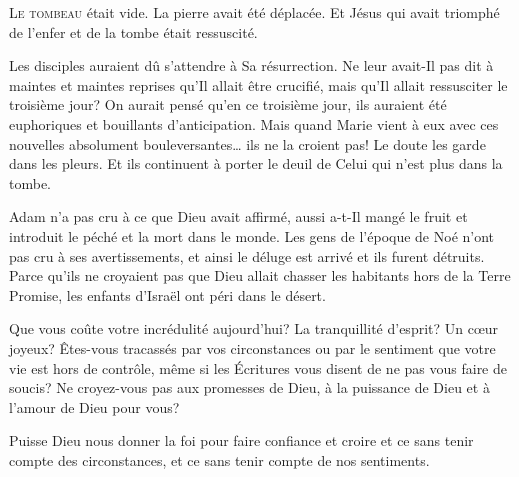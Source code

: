 \dvrule







\lettrine{L}{e tombeau} était vide. La pierre avait été déplacée.
 Et Jésus \ocadr qui avait triomphé de l'enfer et de la tombe \fcadr{}
 était ressuscité.

Les disciples auraient dû s'attendre à Sa résurrection.
 Ne leur avait-Il pas dit à maintes et maintes reprises
 qu'Il allait être crucifié, mais qu'Il allait ressusciter le troisième jour?
 On aurait pensé 
 qu'en ce troisième jour, ils auraient été euphoriques
 et bouillants  d'anticipation.
 Mais quand Marie vient à eux avec ces nouvelles absolument
 bouleversantes\dots{} ils ne la croient pas!
 Le doute les garde dans les pleurs.
 Et ils continuent à  porter
 le deuil de Celui qui n'est plus dans la tombe.


Adam n'a pas cru à ce que Dieu avait affirmé, aussi a-t-Il mangé
 le fruit et introduit le péché et la mort dans le monde.
 Les gens de l'époque de Noé n'ont pas cru à ses avertissements,
 et ainsi le déluge est arrivé et ils furent détruits.
 Parce qu'ils ne croyaient pas que Dieu allait chasser les habitants
 hors de la Terre Promise, les enfants d'Israël ont péri dans le désert.

Que vous coûte votre incrédulité aujourd'hui?
 La tranquillité d'esprit? Un c\oe{}ur joyeux?
 Êtes-vous tracassés par vos circonstances ou par le sentiment
 que votre vie est hors de contrôle, même si les Écritures vous disent
 de ne pas vous faire de soucis? Ne croyez-vous pas aux promesses de Dieu,
 à la puissance de Dieu et à l'amour de Dieu pour vous?

Puisse Dieu nous donner la foi pour faire confiance et croire
 \ocadr et ce sans tenir compte des circonstances,
 et ce sans tenir compte de nos sentiments.

